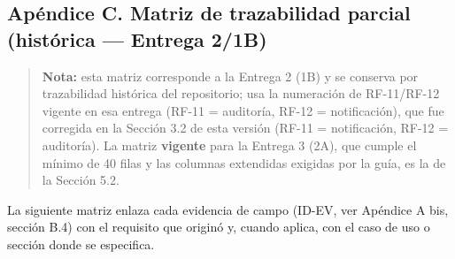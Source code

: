 \documentclass[11pt,a4paper]{article}
\begin{document}
	
	
	\subsection{Apéndice C. Matriz de trazabilidad parcial (histórica --- Entrega 2/1B)}
	
	\begin{quote}
		\textbf{Nota:} esta matriz corresponde a la Entrega 2 (1B) y se conserva por trazabilidad histórica del repositorio; usa la numeración de RF-11/RF-12 vigente en esa entrega (RF-11 = auditoría, RF-12 = notificación), que fue corregida en la Sección 3.2 de esta versión (RF-11 = notificación, RF-12 = auditoría). La matriz \textbf{vigente} para la Entrega 3 (2A), que cumple el mínimo de 40 filas y las columnas extendidas exigidas por la guía, es la de la Sección 5.2.
	\end{quote}
	
	La siguiente matriz enlaza cada evidencia de campo (ID-EV, ver Apéndice A bis, sección B.4) con el requisito que originó y, cuando aplica, con el caso de uso o sección donde se especifica.
	
\end{document}
